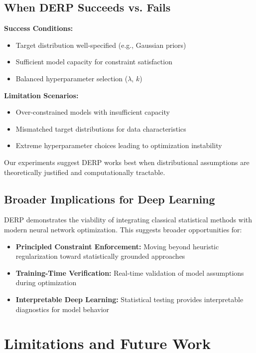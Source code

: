 \documentclass{article}
\begin{document}
\subsection{When DERP Succeeds vs. Fails}

\textbf{Success Conditions:}
\begin{itemize}
\item Target distribution well-specified (e.g., Gaussian priors)
\item Sufficient model capacity for constraint satisfaction
\item Balanced hyperparameter selection ($\lambda$, $k$)
\end{itemize}

\textbf{Limitation Scenarios:}
\begin{itemize}
\item Over-constrained models with insufficient capacity
\item Mismatched target distributions for data characteristics
\item Extreme hyperparameter choices leading to optimization instability
\end{itemize}

Our experiments suggest DERP works best when distributional assumptions are theoretically justified and computationally tractable.

\subsection{Broader Implications for Deep Learning}

DERP demonstrates the viability of integrating classical statistical methods with modern neural network optimization. This suggests broader opportunities for:

\begin{itemize}
\item \textbf{Principled Constraint Enforcement:} Moving beyond heuristic regularization toward statistically grounded approaches
\item \textbf{Training-Time Verification:} Real-time validation of model assumptions during optimization
\item \textbf{Interpretable Deep Learning:} Statistical testing provides interpretable diagnostics for model behavior
\end{itemize}

\section{Limitations and Future Work}
\end{document}
